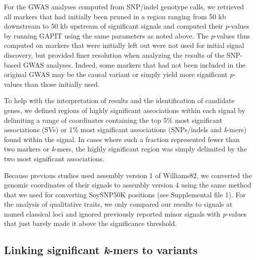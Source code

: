 \documentclass{article}
\begin{document}
For the GWAS analyses computed from SNP/indel genotype calls, we retrieved all
markers that had initially been pruned in a region ranging from 50 kb
downstream to 50 kb upstream of significant signals and computed their
\emph{p}-values by running GAPIT using the same parameters as noted above. The
\emph{p}-values thus computed on markers that were initially left out were not
used for initial signal discovery, but provided finer resolution when analyzing
the results of the SNP-based GWAS analyses. Indeed, some markers that had not
been included in the original GWAS may be the causal variant or simply yield
more significant \emph{p}-values than those initially used.

To help with the interpretation of results and the identification of candidate
genes, we defined regions of highly significant associations within each signal
by delimiting a range of coordinates containing the top 5\% most significant
associations (SVs) or 1\% most significant associations (SNPs/indels
and \emph{k}-mers) found within the signal. In cases where such a fraction
represented fewer than two markers or \emph{k}-mers, the highly significant
region was simply delimited by the two most significant associations.

Because previous studies  used assembly version 1 of
Williams82, we converted the genomic coordinates of their signals to assembly version 4
using the same method that we used for converting
SoySNP50K positions (see Supplemental file 1). For the analysis of
qualitative traits, we only compared our results to signals at named classical
loci and ignored previously reported minor signals with \emph{p}-values that
just barely made it above the significance threshold.

\subsection*{Linking significant \emph{k}-mers to variants}
\end{document}
